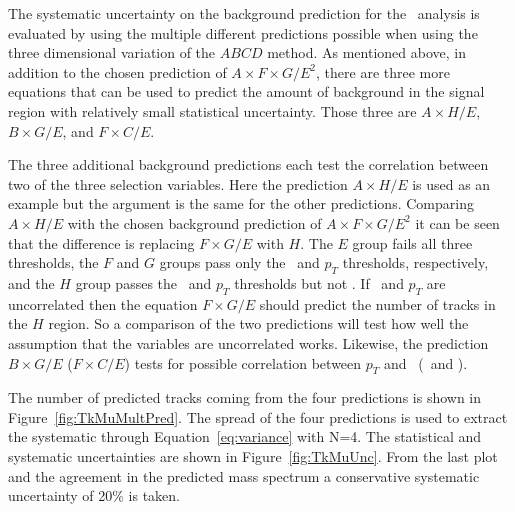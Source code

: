 The systematic uncertainty on the background prediction for the \tktof\ analysis is evaluated by using the multiple different predictions possible when using the
three dimensional variation of the $ABCD$ method. As mentioned above, in addition to the chosen prediction of $A\times F\times G/E^2$, 
there are three more equations that can be used to predict the amount of background in the signal region with relatively small statistical uncertainty.
Those three are $A \times H/E$, $B \times G/E$, and $F \times C/E$.

The three additional background predictions each test the correlation between two of the three selection variables. Here the prediction $A \times H/E$ is used as an example but
the argument is the same for the other predictions. Comparing $A \times H/E$ with the chosen background prediction of $A\times F\times G/E^2$ it can be seen that
the difference is replacing $F\times G/E$ with $H$. The $E$ group fails all three thresholds, the $F$ and $G$ groups pass only the \invbeta\ and $p_T$ thresholds,
respectively, and the $H$ group passes the \invbeta\ and $p_T$ thresholds but not \dedx. If \invbeta\ and $p_T$ are uncorrelated then the equation $F\times G/E$ should
predict the number of tracks in the $H$ region. So a comparison of the two predictions will test how well the assumption that the variables are uncorrelated works.
Likewise, the prediction $B \times G/E$ ($F \times C/E$) tests for possible correlation between $p_T$ and \dedx\ (\invbeta\ and \dedx).

The number of predicted tracks coming from the four predictions is shown in Figure~\ref{fig:TkMuMultPred}. The spread of the four predictions is used to extract 
the systematic through Equation~\ref{eq:variance} with N=4. The statistical and systematic uncertainties are shown in Figure~\ref{fig:TkMuUnc}. From the last plot
and the agreement in the predicted mass spectrum a conservative systematic uncertainty of 20\% is taken.

